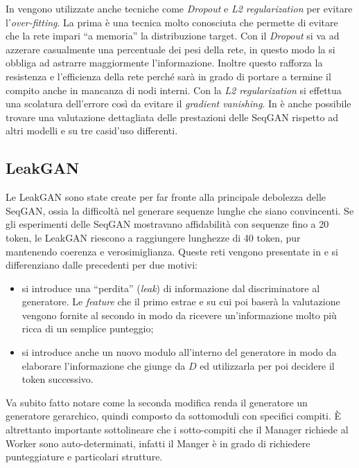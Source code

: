 In \cite{SeqGAN} vengono utilizzate anche tecniche come \emph{Dropout} e \emph{L2 regularization} per evitare l'\emph{over-fitting}. 
La prima è una tecnica molto conosciuta che permette di evitare che la rete impari ``a memoria'' la distribuzione target.
Con il \emph{Dropout} si va ad azzerare casualmente una percentuale dei pesi della rete, in questo modo la si obbliga ad astrarre maggiormente l'informazione.
Inoltre questo rafforza la resistenza e l'efficienza della rete perché sarà in grado di portare a termine il compito anche in mancanza di nodi interni.
Con la \emph{L2 regularization} si effettua una scolatura dell'errore così da evitare il \emph{gradient vanishing}. 
In \cite{SeqGAN} è anche possibile trovare una valutazione dettagliata delle prestazioni delle SeqGAN rispetto ad altri modelli e su tre casi$ $d'uso differenti.


\subsection{LeakGAN}
Le LeakGAN sono state create per far fronte alla principale debolezza delle SeqGAN, ossia la difficoltà nel generare sequenze lunghe che siano convincenti.
Se gli esperimenti delle SeqGAN mostravano affidabilità con sequenze fino a 20 token, le LeakGAN riescono a raggiungere lunghezze di 40 token, pur mantenendo coerenza e verosimiglianza.
Queste reti vengono presentate in \cite{LeakGAN} e si differenziano dalle precedenti per due motivi:
\begin{itemize}
  \item si introduce una ``perdita'' (\emph{leak}) di informazione dal discriminatore al generatore.
    Le \emph{feature} che il primo estrae e su cui poi baserà la valutazione vengono fornite al secondo in modo da ricevere un'informazione molto più ricca di un semplice punteggio; 
  \item si introduce anche un nuovo modulo all'interno del generatore in modo da elaborare l'informazione che giunge da $D$ ed utilizzarla per poi decidere il token successivo.
\end{itemize}


Va subito fatto notare come la seconda modifica renda il generatore un generatore gerarchico, quindi composto da sottomoduli con specifici compiti.
È altrettanto importante sottolineare che i sotto-compiti che il Manager richiede al Worker sono auto-determinati, infatti il Manger è in grado di richiedere punteggiature e particolari strutture.

